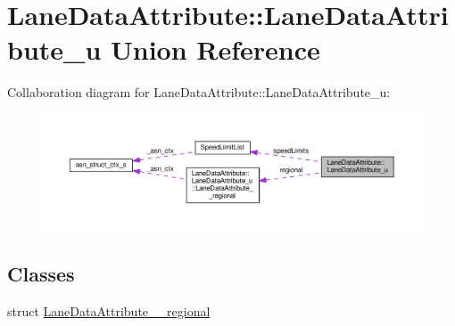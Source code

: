 \hypertarget{unionLaneDataAttribute_1_1LaneDataAttribute__u}{}\section{Lane\+Data\+Attribute\+:\+:Lane\+Data\+Attribute\+\_\+u Union Reference}
\label{unionLaneDataAttribute_1_1LaneDataAttribute__u}


Collaboration diagram for Lane\+Data\+Attribute\+:\+:Lane\+Data\+Attribute\+\_\+u\+:\nopagebreak
\begin{figure}[H]
\begin{center}
\leavevmode
\includegraphics[width=350pt]{unionLaneDataAttribute_1_1LaneDataAttribute__u__coll__graph}
\end{center}
\end{figure}
\subsection*{Classes}
\begin{DoxyCompactItemize}
\item 
struct \hyperlink{structLaneDataAttribute_1_1LaneDataAttribute__u_1_1LaneDataAttribute____regional}{Lane\+Data\+Attribute\+\_\+\+\_\+regional}
\end{DoxyCompactItemize}
